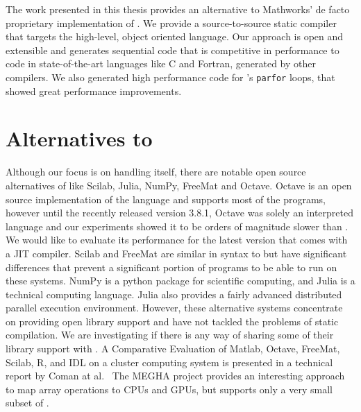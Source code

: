 The work presented in this thesis provides an alternative to Mathworks' de facto
proprietary implementation of \matlab. We provide a source-to-source static
compiler that targets the high-level, object oriented language.  Our approach is
open and extensible and generates sequential \xten code that is competitive in
performance to code in state-of-the-art languages like C and Fortran, generated
by other \matlab compilers. We also generated high performance code for
\matlab's \texttt{parfor} loops, that showed great performance improvements.

\section{Alternatives to \matlab}
Although our focus is on handling \matlab itself, there are notable open source
alternatives of \matlab like Scilab\cite{Scilab}, Julia\cite{julia},
NumPy\cite{numpy}, FreeMat\cite{freemat} and Octave\cite{Octave}.
Octave is an open source implementation of the \matlab language and supports
most of the \matlab programs, however until the recently released version 3.8.1,
Octave was solely an interpreted language and our experiments showed it to be
orders of magnitude slower than \matlab. We would like to evaluate its
performance for the latest version that comes with a JIT compiler. Scilab and
FreeMat are similar in syntax to \matlab but have significant differences that
prevent a significant portion of \matlab programs to be able to run on these systems.
NumPy is a python package for scientific computing, and Julia is a technical
computing language. Julia also provides a fairly advanced distributed parallel
execution environment. However, these alternative systems concentrate on
providing open library support and have not tackled the problems of static
compilation.  We are investigating if there is any way of
sharing some of their library support with \mixten. A Comparative Evaluation of
Matlab, Octave, FreeMat, Scilab, R, and IDL on a cluster computing system is 
presented in a technical report by Coman at al.~\cite{coman}  
The MEGHA
project\cite{megha} provides an interesting approach to map \matlab array
operations to CPUs and GPUs, but supports only a very small subset of \matlab.  


